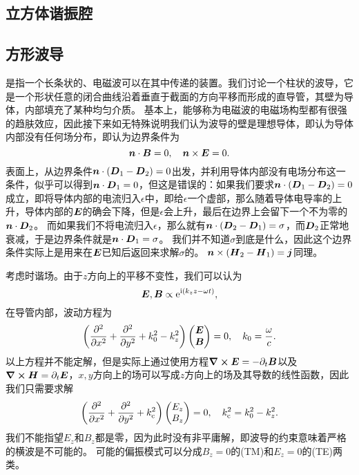 \subsection{立方体谐振腔}

\subsection{方形波导}

是指一个长条状的、电磁波可以在其中传递的装置。我们讨论一个柱状的波导，它是一个形状任意的闭合曲线沿着垂直于截面的方向平移而形成的直导管，其壁为导体，内部填充了某种均匀介质。
基本上，能够称为电磁波的电磁场构型都有很强的趋肤效应，因此接下来如无特殊说明我们认为波导的壁是理想导体，即认为导体内部没有任何场分布，即认为边界条件为
\begin{equation}
    \vb*{n} \cdot \vb*{B} = 0, \quad \vb*{n} \times \vb*{E} = 0.
\end{equation}
表面上，从边界条件$\vb*{n} \cdot (\vb*{D}_1 - \vb*{D}_2) = 0$出发，并利用导体内部没有电场分布这一条件，似乎可以得到$\vb*{n} \cdot \vb*{D}_1=0$，但这是错误的：如果我们要求$\vb*{n} \cdot (\vb*{D}_1 - \vb*{D}_2) = 0$成立，即将导体内部的电流归入$\epsilon$中，即给$\epsilon$一个虚部，那么随着导体电导率的上升，导体内部的$\vb*{E}$的确会下降，但是$\epsilon$会上升，最后在边界上会留下一个不为零的$\vb*{n} \cdot \vb*{D}_2$。
而如果我们不将电流归入$\epsilon$，那么就有$\vb*{n} \cdot (\vb*{D}_2 - \vb*{D}_1) = \sigma$，而$\vb*{D}_2$正常地衰减，于是边界条件就是$\vb*{n} \cdot \vb*{D}_1 = \sigma$。
我们并不知道$\sigma$到底是什么，因此这个边界条件实际上是用来在$\vb*{E}$已知后返回来求解$\sigma$的。
$\vb*{n} \times (\vb*{H}_2 - \vb*{H}_1) = \vb*{j}$同理。

考虑时谐场。由于$z$方向上的平移不变性，我们可以认为
\[
    \vb*{E}, \vb*{B} \propto \mathrm{e}^{\mathrm{i} (k_z z - \omega t)},
\]
在导管内部，波动方程为
\begin{equation}
    \left( \pdv[2]{x} + \pdv[2]{y} + k_0^2 - k_z^2 \right) \pmqty{\vb*{E} \\ \vb*{B}} = 0, \quad k_0 = \frac{\omega}{c}.
\end{equation}
以上方程并不能定解，但是实际上通过使用方程$\curl{\vb*{E}}=-\partial_t \vb*{B}$以及$\curl{\vb*{H}} = \partial_t \vb*{E}$，$x, y$方向上的场可以写成$z$方向上的场及其导数的线性函数，因此我们只需要求解
\begin{equation}
    \left( \pdv[2]{x} + \pdv[2]{y} + k_\text{c}^2 \right) \pmqty{E_z \\ B_z} = 0, \quad k_\text{c}^2 = k_0^2 - k_z^2.
\end{equation}
我们不能指望$E_z$和$B_z$都是零，因为此时没有非平庸解，即波导的约束意味着严格的横波是不可能的。
可能的偏振模式可以分成$B_z=0$的(TM)和$E_z=0$的(TE)两类。

